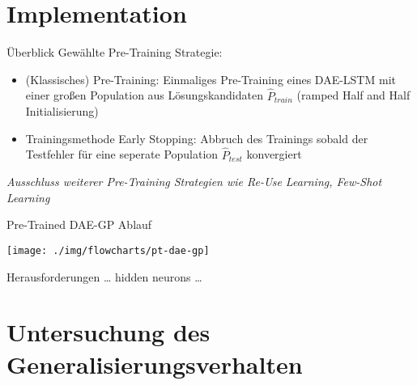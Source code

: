 \documentclass[
  ignorenonframetext,
]{beamer}
\begin{document}
\hypertarget{implementation}{%
\section{Implementation}\label{implementation}}

\begin{frame}{Überblick}
\protect\hypertarget{uxfcberblick}{}
Gewählte Pre-Training Strategie:

\begin{itemize}
\item
  (Klassisches) Pre-Training: Einmaliges Pre-Training eines DAE-LSTM mit
  einer großen Population aus Lösungskandidaten \(\hat{P}_{train}\)
  (ramped Half and Half Initialisierung)
\item
  Trainingsmethode Early Stopping: Abbruch des Trainings sobald der
  Testfehler für eine seperate Population \(\hat{P}_{test}\) konvergiert
\end{itemize}

\emph{Ausschluss weiterer Pre-Training Strategien wie Re-Use Learning,
Few-Shot Learning}
\end{frame}

\begin{frame}{Pre-Trained DAE-GP Ablauf}
\protect\hypertarget{pre-trained-dae-gp-ablauf}{}
\begin{center}\texttt{[image: ./img/flowcharts/pt-dae-gp]} \end{center}
\end{frame}

\begin{frame}{Herausforderungen}
\protect\hypertarget{herausforderungen}{}
\ldots{} hidden neurons \ldots{}
\end{frame}

\hypertarget{untersuchung-des-generalisierungsverhalten}{%
\section{Untersuchung des
Generalisierungsverhalten}\label{untersuchung-des-generalisierungsverhalten}}
\end{document}
